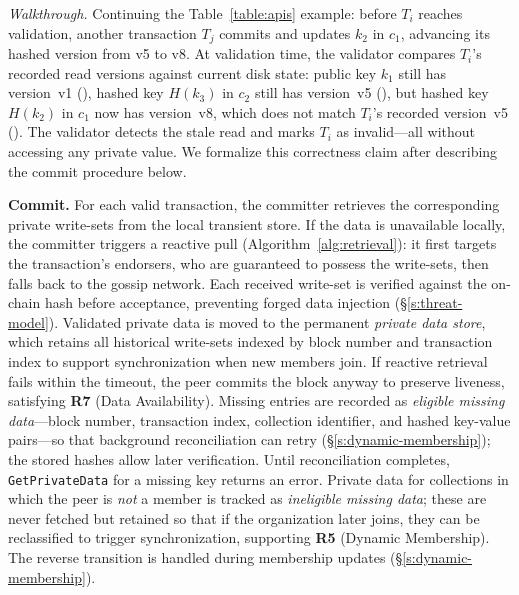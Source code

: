 \noindent\textit{Walkthrough.}
Continuing the Table~\ref{table:apis} example: before $T_i$ reaches validation, another transaction $T_j$ commits and updates $k_2$ in $c_1$, advancing its hashed version from v5 to v8. At validation time, the validator compares $T_i$'s recorded read versions against current disk state: public key $k_1$ still has version~v1 (\cmark), hashed key $H(k_3)$ in $c_2$ still has version~v5 (\cmark), but hashed key $H(k_2)$ in $c_1$ now has version~v8, which does not match $T_i$'s recorded version~v5 (\xmark). The validator detects the stale read and marks $T_i$ as invalid---all without accessing any private value.
We formalize this correctness claim after describing the commit procedure below.

\noindent\textbf{Commit.}
For each valid transaction, the committer retrieves the corresponding private write-sets from the local transient store. If the data is unavailable locally, the committer triggers a reactive pull (Algorithm~\ref{alg:retrieval}): it first targets the transaction's endorsers, who are guaranteed to possess the write-sets, then falls back to the gossip network. Each received write-set is verified against the on-chain hash before acceptance, preventing forged data injection (\S\ref{s:threat-model}). Validated private data is moved to the permanent \textit{private data store}, which retains all historical write-sets indexed by block number and transaction index to support synchronization when new members join.
If reactive retrieval fails within the timeout, the peer commits the block anyway to preserve liveness, satisfying \textbf{R7} (Data Availability). Missing entries are recorded as \textit{eligible missing data}---block number, transaction index, collection identifier, and hashed key-value pairs---so that background reconciliation can retry (\S\ref{s:dynamic-membership}); the stored hashes allow later verification. Until reconciliation completes, \texttt{GetPrivateData} for a missing key returns an error. Private data for collections in which the peer is \textit{not} a member is tracked as \textit{ineligible missing data}; these are never fetched but retained so that if the organization later joins, they can be reclassified to trigger synchronization, supporting \textbf{R5} (Dynamic Membership). The reverse transition is handled during membership updates (\S\ref{s:dynamic-membership}).

